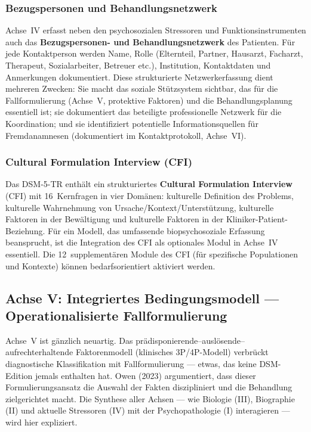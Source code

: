 \documentclass[11pt,a4paper]{article}
\begin{document}
\subsubsection{Bezugspersonen und Behandlungsnetzwerk}

Achse~IV erfasst neben den psychosozialen Stressoren und Funktionsinstrumenten auch das \textbf{Bezugspersonen- und Behandlungsnetzwerk} des Patienten. F\"ur jede Kontaktperson werden Name, Rolle (Elternteil, Partner, Hausarzt, Facharzt, Therapeut, Sozialarbeiter, Betreuer etc.), Institution, Kontaktdaten und Anmerkungen dokumentiert. Diese strukturierte Netzwerkerfassung dient mehreren Zwecken: Sie macht das soziale St\"utzsystem sichtbar, das f\"ur die Fallformulierung (Achse~V, protektive Faktoren) und die Behandlungsplanung essentiell ist; sie dokumentiert das beteiligte professionelle Netzwerk f\"ur die Koordination; und sie identifiziert potentielle Informationsquellen f\"ur Fremdanamnesen (dokumentiert im Kontaktprotokoll, Achse~VI).

\subsubsection{Cultural Formulation Interview (CFI)}

Das DSM-5-TR enth\"alt ein strukturiertes \textbf{Cultural Formulation Interview} (CFI) mit 16~Kernfragen in vier Dom\"anen: kulturelle Definition des Problems, kulturelle Wahrnehmung von Ursache/Kontext/Unterst\"utzung, kulturelle Faktoren in der Bew\"altigung und kulturelle Faktoren in der Kliniker-Patient-Beziehung. F\"ur ein Modell, das umfassende biopsychosoziale Erfassung beansprucht, ist die Integration des CFI als optionales Modul in Achse~IV essentiell. Die 12~supplementären Module des CFI (f\"ur spezifische Populationen und Kontexte) k\"onnen bedarfsorientiert aktiviert werden.

\subsection{Achse V: Integriertes Bedingungsmodell --- Operationalisierte Fallformulierung}
\label{sec:achse5}

Achse~V ist g\"anzlich neuartig. Das pr\"adisponierende--ausl\"osende--aufrechterhaltende Faktorenmodell (klinisches 3P/4P-Modell) verbr\"uckt diagnostische Klassifikation mit Fallformulierung --- etwas, das keine DSM-Edition jemals enthalten hat. Owen (2023) argumentiert, dass dieser Formulierungsansatz \glqq die Auswahl der Fakten diszipliniert und die Behandlung zielgerichtet macht\grqq{}. Die Synthese aller Achsen --- wie Biologie (III), Biographie (II) und aktuelle Stressoren (IV) mit der Psychopathologie (I) interagieren --- wird hier expliziert.
\end{document}
